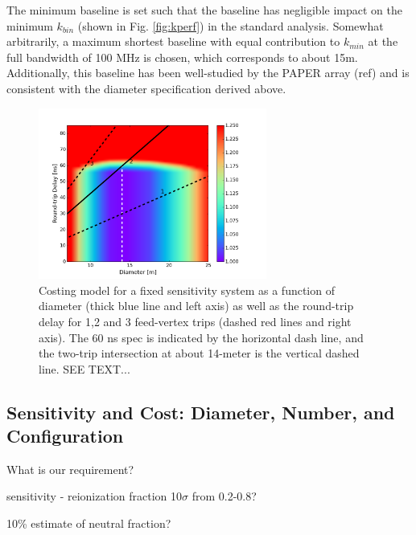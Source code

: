 \documentclass{article}
\begin{document}
The minimum baseline is set such that the baseline has negligible impact on the minimum $k_{bin}$ (shown in Fig. \ref{fig:kperf}) in the standard analysis.  Somewhat arbitrarily, a maximum shortest baseline with equal contribution to $k_{min}$ at the full bandwidth of 100 MHz is chosen, which corresponds to about 15m.  Additionally, this baseline has been well-studied by the PAPER array (ref) and is consistent with the diameter specification derived above.

\begin{figure}[t]
\centerline{
\includegraphics[width=7.5cm]{plots/costfigNew.png} 
}
\caption{\small Costing model for a fixed sensitivity system as a function of diameter (thick blue line and left axis) as well as the round-trip delay for 1,2 and 3 feed-vertex trips (dashed red lines and right axis).  The 60 ns spec is indicated by the horizontal dash line, and the two-trip intersection at about 14-meter is the vertical dashed line.  SEE TEXT...
\label{fig:costfig}}
\end{figure}

\subsection{Sensitivity and Cost:  Diameter, Number, and Configuration}
\label{sec:cost}
What is our requirement?

sensitivity - reionization fraction 10$\sigma$ from 0.2-0.8?

10\% estimate of neutral fraction?
\end{document}
